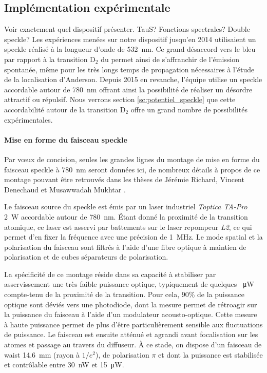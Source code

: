 \subsection{Implémentation expérimentale}
{\Large\color{red} Voir exactement quel dispositif présenter. TauS? Fonctions spectrales? Double speckle?}
Les expériences menées sur notre dispositif jusqu'en 2014 utilisaient un speckle réalisé à la longueur d'onde de \SI{532}{\nano\metre}. Ce grand désaccord vers le bleu par rapport à la transition $\mathrm{D}_2$ du  permet ainsi de s'affranchir de l'émission spontanée, même pour les très longs temps de propagation nécessaires à l'étude de la localisation d'Anderson. Depuis 2015 en revanche, l'équipe utilise un speckle accordable autour de \SI{780}{\nano\metre} offrant ainsi la possibilité de réaliser un désordre attractif ou répulsif. Nous verrons section \ref{sc:potentiel_speckle} que cette accordabilité autour de la transition $\mathrm{D}_2$ offre un grand nombre de possibilités expérimentales.

\paragraph*{Mise en forme du faisceau speckle}
Par vœux de concision, seules les grandes lignes du montage de mise en forme du faisceau speckle à \SI{780}{\nano\metre} seront données ici, de nombreux détails à propos de ce montage pouvant être retrouvés dans les thèses de Jérémie Richard, Vincent Denechaud et Musawwadah Mukhtar \citep{richard2015propagation, denechaud2018vers, mukhtar2019state}.

Le faisceau source du speckle est émis par un laser industriel \emph{Toptica TA-Pro} \SI{2}{\watt} accordable autour de \SI{780}{\nano\metre}. Étant donné la proximité de la transition atomique, ce laser est asservi par battements sur le laser repompeur \emph{L2}, ce qui permet d'en fixer la fréquence avec une précision de \SI{1}{\mega\hertz}. Le mode spatial et la polarisation du faisceau sont filtrés à l'aide d'une fibre optique à maintien de polarisation et de cubes séparateurs de polarisation.

La spécificité de ce montage réside dans sa capacité à stabiliser par asservissement une très faible puissance optique, typiquement de quelques \SI{}{\micro\watt} compte-tenu de la proximité de la transition. Pour cela, 90\% de la puissance optique sont déviés vers une photodiode, dont la mesure permet de rétroagir sur la puissance du faisceau à l'aide d'un modulateur acousto-optique. Cette mesure à haute puissance permet de plus d'être particulièrement sensible aux fluctuations de puissance. Le faisceau est ensuite atténué et agrandi avant focalisation sur les atomes et passage au travers du diffuseur. À ce stade, on dispose d'un faisceau de waist \SI{14.6}{\milli\metre} (rayon à $1/e^2$), de polarisation $\pi$ et dont la puissance est stabilisée et contrôlable entre \SI{30}{\nano\watt} et \SI{15}{\micro\watt}.


